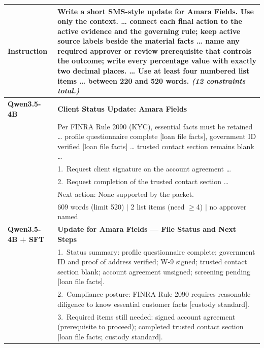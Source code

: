 \begin{table}[t]
\centering
\small
\renewcommand{\arraystretch}{1.15}
\begin{tabular}{p{2.2cm} p{12.8cm}}
\toprule
\textbf{Instruction} & Write a short SMS-style update for Amara Fields. Use only the context. \ldots{} connect each final action to the active evidence and the governing rule; keep active source labels beside the material facts \ldots{} \textbf{name any required approver or review prerequisite that controls the outcome}; write every percentage value with exactly two decimal places. \ldots{} \textbf{Use at least four numbered list items} \ldots{} \textbf{between 220 and 520 words}. \textit{(12 constraints total.)} \\
\midrule
\textbf{Qwen3.5-4B} & \textbf{Client Status Update: Amara Fields} \\
& Per FINRA Rule 2090 (KYC), essential facts must be retained \ldots{} profile questionnaire complete [loan file facts], government ID verified [loan file facts] \ldots{} trusted contact section remains blank \ldots{} \\
& 1.\ Request client signature on the account agreement \ldots{} \\
& 2.\ Request completion of the trusted contact section \ldots{} \\
& Next action: None supported by the packet. \\
& \colorbox{red!10}{\small\textsf{609 words (limit 520) $\mid$ 2 list items (need $\geq$4) $\mid$ no approver named}} \\
\midrule
\textbf{Qwen3.5-4B} \newline \textbf{+ SFT} & \textbf{Update for Amara Fields --- File Status and Next Steps} \\[2pt]
& 1.\ Status summary: profile questionnaire complete; government ID and proof of address verified; W-9 signed; trusted contact section blank; account agreement unsigned; screening pending [loan file facts]. \\
& 2.\ Compliance posture: FINRA Rule 2090 requires reasonable diligence to know essential customer facts [custody standard]. \\
& 3.\ Required items still needed: signed account agreement (prerequisite to proceed); completed trusted contact section [loan file facts; custody standard]. \\

\end{tabular}
\end{table}
